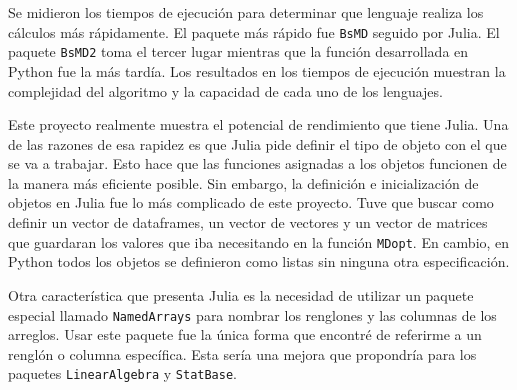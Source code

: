 Se midieron los tiempos de ejecución para determinar que lenguaje realiza los cálculos más rápidamente. El paquete más rápido fue \texttt{BsMD} seguido por \textsf{Julia}. El paquete \texttt{BsMD2} toma el tercer lugar mientras que la función desarrollada en \textsf{Python} fue la más tardía. Los resultados en los tiempos de ejecución muestran la complejidad del algoritmo y la capacidad de cada uno de los lenguajes. 

Este proyecto realmente muestra el potencial de rendimiento que tiene \textsf{Julia}. Una de las razones de esa rapidez es que \textsf{Julia} pide definir el tipo de objeto con el que se va a trabajar. Esto hace que las funciones asignadas a los objetos funcionen de la manera más eficiente posible. Sin embargo, la definición e inicialización de objetos en \textsf{Julia} fue lo más complicado de este proyecto. Tuve que buscar como definir un vector de dataframes, un vector de vectores y un vector de matrices que guardaran los valores que iba necesitando en la función \texttt{MDopt}. En cambio, en \textsf{Python} todos los objetos se definieron como listas sin ninguna otra especificación. 

Otra característica que presenta \textsf{Julia} es la necesidad de utilizar un paquete especial llamado \texttt{NamedArrays} para nombrar los renglones y las columnas de los arreglos. Usar este paquete fue la única forma que encontré de referirme a un renglón o columna específica. Esta sería una mejora que propondría para los paquetes \texttt{LinearAlgebra} y \texttt{StatBase}. 
















 



